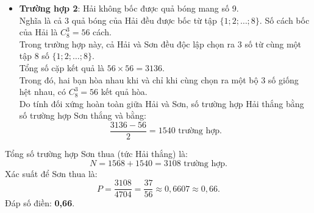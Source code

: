 \documentclass[12pt,a4paper]{article}
\begin{document}
\begin{enumerate}[label=\textbf{Câu \arabic*:}, leftmargin=*]
\begin{itemize}
    \item \textbf{Trường hợp 2}: Hải không bốc được quả bóng mang số 9.\\
    Nghĩa là cả 3 quả bóng của Hải đều được bốc từ tập $\{1; 2; \dots; 8\}$. Số cách bốc của Hải là $C_8^3 = 56$ cách.\\
    Trong trường hợp này, cả Hải và Sơn đều độc lập chọn ra 3 số từ cùng một tập 8 số $\{1; 2; \dots; 8\}$.\\
    Tổng số cặp kết quả là $56 \times 56 = 3136$.\\
    Trong đó, hai bạn hòa nhau khi và chỉ khi cùng chọn ra một bộ 3 số giống hệt nhau, có $C_8^3 = 56$ kết quả hòa.\\
    Do tính đối xứng hoàn toàn giữa Hải và Sơn, số trường hợp Hải thắng bằng số trường hợp Sơn thắng và bằng:
    $$\dfrac{3136 - 56}{2} = 1540\text{ trường hợp}.$$
\end{itemize}
Tổng số trường hợp Sơn thua (tức Hải thắng) là:
$$N = 1568 + 1540 = 3108\text{ trường hợp}.$$
Xác suất để Sơn thua là:
$$P = \dfrac{3108}{4704} = \dfrac{37}{56} \approx 0{,}6607 \approx 0{,}66.$$
Đáp số điền: \textbf{0,66}.
\end{enumerate}
\end{document}
